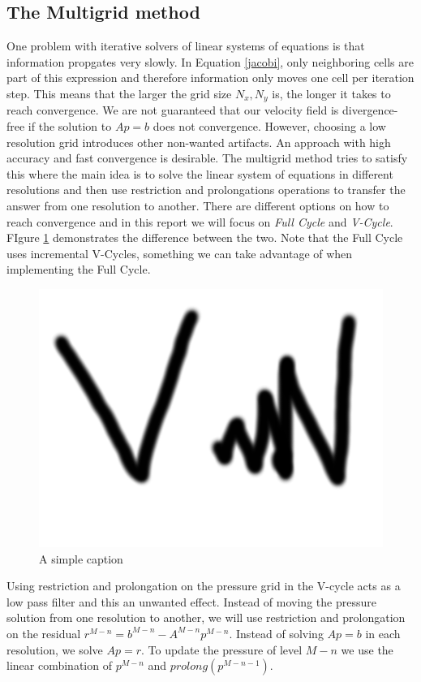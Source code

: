 \subsection{The Multigrid method}

One problem with iterative solvers of linear systems of equations is that information propgates very slowly. In Equation \ref{jacobi}, only neighboring cells are part of this expression and therefore information only moves one cell per iteration step. This means that the larger the grid size $N_x, N_y$ is, the longer it takes to reach convergence. We are not guaranteed that our velocity field is divergence-free if the solution to $Ap=b$ does not convergence. However, choosing a low resolution grid introduces other non-wanted artifacts. An approach with high accuracy and fast convergence is desirable. The multigrid method tries to satisfy this where the main idea is to solve the linear system of equations in different resolutions and then use restriction and prolongations operations to transfer the answer from one resolution to another. There are different options on how to reach convergence and in this report we will focus on \emph{Full Cycle} and \emph{V-Cycle}. FIgure \ref{multigrid} demonstrates the difference between the two. Note that the Full Cycle uses incremental V-Cycles, something we can take advantage of when implementing the Full Cycle.

\begin{figure}[ht!]
\centering
\includegraphics[width=120mm]{img/multigrid.png}
\caption{A simple caption}
\label{multigrid}
\end{figure}

Using restriction and prolongation on the pressure grid in the V-cycle acts as a low pass filter and this an unwanted effect. Instead of moving the pressure solution from one resolution to another, we will use restriction and prolongation on the residual $r^{M-n} = b^{M-n} - A^{M-n}p^{M-n}$. Instead of solving $Ap = b$ in each resolution, we solve $Ap = r$. To update the pressure of level $M-n$ we use the linear combination of $p^{M-n}$ and $prolong(p^{M-n-1})$.

